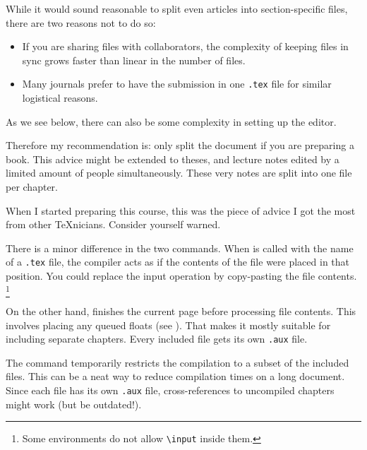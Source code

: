 \begin{practices}
While it would sound reasonable to split even articles into section-specific files,
there are two reasons not to do so:
\begin{itemize}
\item If you are sharing files with collaborators,
    the complexity of keeping files in sync grows faster than linear in the number of files.
\item Many journals prefer to have the submission in one \verb|.tex| file
    for similar logistical reasons.
\end{itemize}
%
As we see below, there can also be some complexity in setting up the editor.

Therefore my recommendation is:
only split the document if you are preparing a book.
This advice might be extended to theses, and lecture notes
edited by a limited amount of people simultaneously.
These very notes are split into one file per chapter.\footnotemark

When I started preparing this course,
this was the piece of advice I got the most from other \TeX{}nicians.
Consider yourself warned.
\end{practices}

There is a minor difference in the two commands.
When  is called with the name of a \verb|.tex| file,
the compiler acts as if the contents of the file were placed in that position.
You could replace the input operation by copy-pasting the file contents.%
\footnote{Some environments do not allow \texttt{\textbackslash input} inside them.}

On the other hand,  finishes the current page
before processing file contents.
This involves placing any queued floats (see ).
That makes it mostly suitable for including separate chapters.
Every included file gets its own \verb|.aux| file.

The  command temporarily restricts the compilation to a subset of the included files.
This can be a neat way to reduce compilation times on a long document.
Since each file has its own \verb|.aux| file,
cross-references to uncompiled chapters might work (but be outdated!).

\begin{ExampleCode}


\end{ExampleCode}

